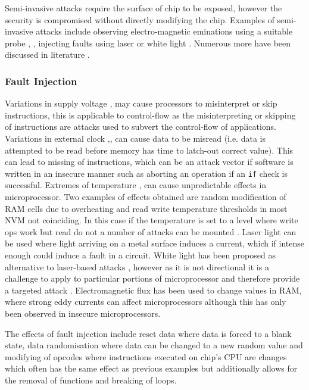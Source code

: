 Semi-invasive attacks require the surface of chip to be exposed, however the security is compromised without directly modifying the chip. Examples of semi-invasive attacks include observing electro-magnetic eminations using a suitable probe \cite{Gandolfi2007}, \cite{Quisquater2001}, injecting faults using laser \cite{Bar-el2006} or white light \cite{Skorobogatov2007}. Numerous more have been discussed in literature \cite{Skorobogatov2005}.

\subsubsection{Fault Injection}

Variations in supply voltage \cite{Anderson1996},\cite{Blomer2010} may cause processors to misinterpret or skip instructions, this is applicable to control-flow as the misinterpreting or skipping of instructions are attacks used to subvert the control-flow of applications.
Variations in external clock \cite{Anderson1996},\cite{Street},\cite{Kommerling1999} can cause data to be misread (i.e. data is attempted to be read before memory has time to latch-out correct value). This can lead to missing of instructions, which can be an attack vector if software is written in an insecure manner such as aborting an operation if an \verb|if| check is successful.
Extremes of temperature \cite{Boneh},\cite{Govindavajhala2003} can cause unpredictable effects in microprocessor. Two examples of effects obtained \cite{Bar-el2006} are random modification of RAM cells due to overheating and read write temperature thresholds in most NVM  not coinciding. In this case if the temperature is set to a level where write ops work but read do not a number of attacks can be mounted . Laser light \cite{Habing1965} can be used where light arriving on a metal surface induces a current, which if intense enough could induce a fault in a circuit. White light \cite{Anderson1996} has been proposed as alternative to laser-based attacks  \cite{Skorobogatov2007}, however as it is not directional it is a challenge to apply to particular portions of microprocessor and therefore provide a targeted attack . Electromagnetic flux \cite{Samyde2003} has been used to change values in RAM, where strong eddy currents can affect microprocessors although this has only been observed in insecure microprocessors.

The effects of fault injection include reset data where data is forced to a blank state, data randomisation where data can be changed to a new random value and modifying of opcodes where instructions executed on chip's CPU are changes\cite{Anderson1996} which often has the same effect as previous examples but additionally allows for the removal of functions and breaking of loops. 

